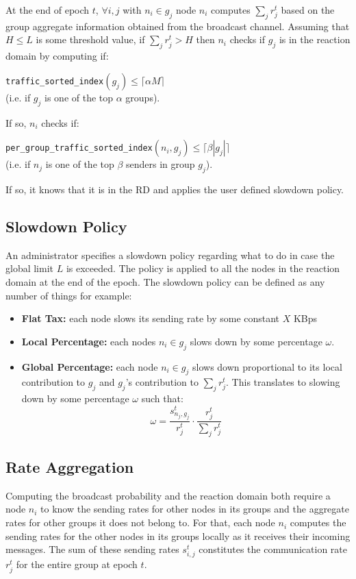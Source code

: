 \documentclass[lettersize,12pt]{article}
\begin{document}
At the end of epoch $t$, $\forall i,j$ with $n_i \in g_j$ node $n_i$ computes $\sum_j r_j^t$ based on the group aggregate information obtained from the broadcast channel. Assuming that $H \leq L$ is some threshold value, if $\sum_j r_j^t > H$ then $n_i$ checks if $g_j$ is in the reaction domain by computing if:

\begin{center}
\verb|traffic_sorted_index|$(g_j) \leq \lceil \alpha M \rceil$\\
(i.e. if $g_j$ is one of the top $\alpha$ groups).
\end{center}

If so, $n_i$ checks if:
\begin{center}
\verb|per_group_traffic_sorted_index|$(n_i, g_j) \leq \lceil \beta |g_j| \rceil$\\
(i.e. if $n_j$ is one of the top $\beta$ senders in group $g_j$).
\end{center}

If so, it knows that it is in the RD and applies the user defined slowdown policy.

\subsection{Slowdown Policy}
An administrator specifies a slowdown policy regarding what to do in case the global limit $L$ is exceeded. The policy is applied to all the nodes in the reaction domain at the end of the epoch. The slowdown policy can be defined as any number of things for example:

\begin{itemize}
\item \textbf{Flat Tax:} each node slows its sending rate by some constant $X$ KBps
\item \textbf{Local Percentage:} each nodes $n_i \in g_j$ slows down by some percentage $\omega$.
\item \textbf{Global Percentage:} each node $n_i \in g_j$ slows down proportional to its local contribution to $g_j$ and $g_j$'s contribution to $\sum_j r_j^t$. This translates to slowing down by some percentage $\omega$ such that:
\[\omega = \frac{s_{n_j, g_j}^t}{r_j^t} \cdot \frac{r_j^t}{\sum_j r_j^t}\]
\end{itemize}

\subsection{Rate Aggregation}
Computing the broadcast probability and the reaction domain both require a node $n_i$ to know the sending rates for other nodes in its groups and the aggregate rates for other groups it does not belong to. For that, each node $n_i$ computes the sending rates for the other nodes in its groups locally as it receives their incoming messages. The sum of these sending rates $s_{i, j}^t$ constitutes the communication rate $r_j^t$ for the entire group at epoch $t$.
\end{document}
